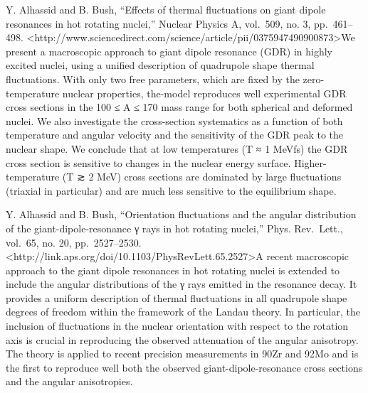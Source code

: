 \documentclass[]{article}
\begin{document}
Y. Alhassid and B. Bush, ``Effects of thermal fluctuations on giant
dipole resonances in hot rotating nuclei,'' Nuclear Physics A, vol.~509,
no. 3, pp.~461--498.
\textless{}http://www.sciencedirect.com/science/article/pii/0375947490900873\textgreater{}We
present a macroscopic approach to giant dipole resonance (GDR) in highly
excited nuclei, using a unified description of quadrupole shape thermal
fluctuations. With only two free parameters, which are fixed by the
zero-temperature nuclear properties, the-model reproduces well
experimental GDR cross sections in the 100 ≤ A ≤ 170 mass range for both
spherical and deformed nuclei. We also investigate the cross-section
systematics as a function of both temperature and angular velocity and
the sensitivity of the GDR peak to the nuclear shape. We conclude that
at low temperatures (T ≈ 1 MeVfs) the GDR cross section is sensitive to
changes in the nuclear energy surface. Higher-temperature (T ≳ 2 MeV)
cross sections are dominated by large fluctuations (triaxial in
particular) and are much less sensitive to the equilibrium shape.

Y. Alhassid and B. Bush, ``Orientation fluctuations and the angular
distribution of the giant-dipole-resonance γ rays in hot rotating
nuclei,'' Phys. Rev.~Lett., vol.~65, no. 20, pp.~2527--2530.
\textless{}http://link.aps.org/doi/10.1103/PhysRevLett.65.2527\textgreater{}A
recent macroscopic approach to the giant dipole resonances in hot
rotating nuclei is extended to include the angular distributions of the
γ rays emitted in the resonance decay. It provides a uniform description
of thermal fluctuations in all quadrupole shape degrees of freedom
within the framework of the Landau theory. In particular, the inclusion
of fluctuations in the nuclear orientation with respect to the rotation
axis is crucial in reproducing the observed attenuation of the angular
anisotropy. The theory is applied to recent precision measurements in
90Zr and 92Mo and is the first to reproduce well both the observed
giant-dipole-resonance cross sections and the angular anisotropies.
\end{document}
